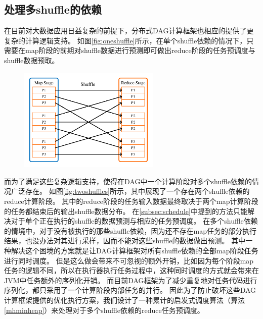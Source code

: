 \subsection{处理多shuffle的依赖}

在目前对大数据应用日益复杂的前提下，分布式DAG计算框架也相应的提供了更复杂的计算逻辑支持。
如图\ref{fig:oneshuffle}所示，在单个shuffle依赖的情况下，只需要在map阶段的前期对shuffle数据进行预测即可做出reduce阶段的任务预调度与shuffle数据预取。

\begin{figure}[!htp]
    \centering
    \includegraphics[width=0.6\textwidth]{../figure/oneshuffle.pdf}
\end{figure}

而为了满足这些复杂逻辑支持，使得在DAG中一个计算阶段对多个shuffle依赖的情况广泛存在。
如图\ref{fig:twoshuffles}所示，其中展现了一个存在两个shuffle依赖的reduce计算阶段。
其中的reduce阶段的任务输入数据最终取决于两个map计算阶段的任务都结束后的输出shuffle数据分布。
在\ref{subsec:schedule}中提到的方法只能解决对于单个正在执行的shuffle的数据预测与相应的任务预调度。
在多个shuffle依赖的情境中，对于没有被执行的那些shuffle依赖，因为还不存在map任务的部分执行结果，也没办法对其进行采样，因而不能对这些shuffle的数据做出预测。
其中一种解决这个困境的方案就是让DAG计算框架对所有shuffle依赖的全部map阶段任务进行同时调度。
但是这么做会带来不可忽视的额外开销，比如因为每个阶段map任务的逻辑不同，所以在执行器执行任务过程中，这种同时调度的方式就会带来在JVM中任务额外的序列化开销。
而目前DAG框架为了减少重复地对任务代码进行序列化，都只采用了一个计算阶段内部任务的并行。
因此为了防止破坏这些DAG计算框架提供的优化执行方案，我们设计了一种累计的启发式调度算法（算法\ref{mhminheap}）来处理对于多个shuffle依赖的reduce任务预调度。

